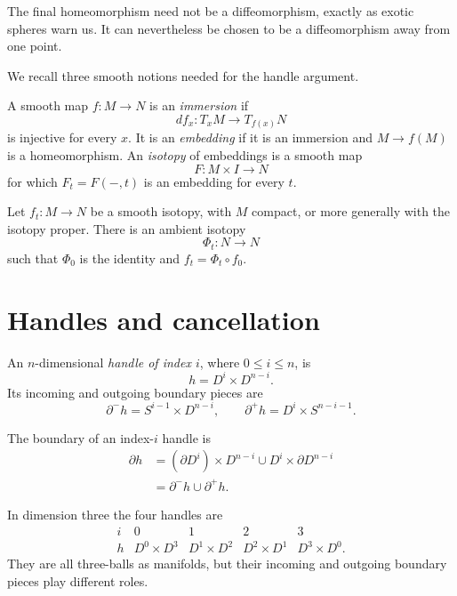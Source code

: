 \begin{remark}
\label{at-remark-exotic-capping-map}
The final homeomorphism need not be a
diffeomorphism, exactly as exotic spheres
warn us.  It can nevertheless be chosen to
be a diffeomorphism away from one point.
\end{remark}

We recall three smooth notions needed for
the handle argument.

\begin{definition}
\label{at-definition-immersion-embedding}
A smooth map $f:M\longrightarrow N$ is an
\emph{immersion} if
$$
df_x:T_xM\longrightarrow T_{f(x)}N
$$
is injective for every $x$.  It is an
\emph{embedding} if it is an immersion and
$M\longrightarrow f(M)$ is a homeomorphism.
An \emph{isotopy} of embeddings is a smooth
map
$$
F:M\times I\longrightarrow N
$$
for which $F_t=F(-,t)$ is an embedding for
every $t$.
\end{definition}

\begin{theorem}
\label{at-theorem-isotopy-extension}
Let $f_t:M\longrightarrow N$ be a smooth
isotopy, with $M$ compact, or more generally
with the isotopy proper.  There is an ambient
isotopy
$$
\Phi_t:N\longrightarrow N
$$
such that $\Phi_0$ is the identity and
$f_t=\Phi_t\circ f_0$.
\end{theorem}
\section{Handles and cancellation}
\label{section-handles}

\begin{definition}
\label{at-definition-handle}
An $n$-dimensional \emph{handle of index
$i$}, where $0\leq i\leq n$, is
$$
h=D^i\times D^{n-i}.
$$
Its incoming and outgoing boundary pieces are
$$
\partial^-h=S^{i-1}\times D^{n-i},
\qquad
\partial^+h=D^i\times S^{n-i-1}.
$$
\end{definition}

\begin{proposition}
\label{at-proposition-handle-boundary}
The boundary of an index-$i$ handle is
$$
\begin{aligned}
\partial h
&=(\partial D^i)\times D^{n-i}
\mathbin{\cup}
D^i\times\partial D^{n-i}\\
&=\partial^-h\cup\partial^+h.
\end{aligned}
$$
\end{proposition}

\begin{example}
\label{at-example-three-dimensional-handles}
In dimension three the four handles are
$$
\begin{matrix}
i&0&1&2&3\\
h&D^0\times D^3&D^1\times D^2&
D^2\times D^1&D^3\times D^0.
\end{matrix}
$$
They are all three-balls as manifolds, but
their incoming and outgoing boundary pieces
play different roles.
\end{example}

